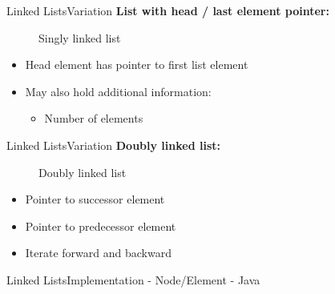 \begin{frame}{Linked Lists}{Variation}
  \textbf{List with head / last element pointer:}
  \begin{figure}
    
    \caption{Singly linked list}
    \label{fig:linked_list:variation:singly_linked_list_with_head}
  \end{figure}
  \begin{itemize}
    \item<3->
      Head element has pointer to first list element
    \item<4->
      May also hold additional information:
      \begin{itemize}
        \item<5->
          Number of elements
      \end{itemize}
  \end{itemize}
\end{frame}


\begin{frame}{Linked Lists}{Variation}
  \textbf{Doubly linked list:}
    \begin{figure}
    
    \caption{Doubly linked list}
    \label{fig:linked_list:variation:doubly_linked_list}
  \end{figure}
  \begin{itemize}
    \item<3->
      Pointer to successor element
    \item<4->
      Pointer to predecessor element
    \item<5->
      Iterate forward and backward
  \end{itemize}
\end{frame}



\begin{frame}[fragile]{Linked Lists}{Implementation - Node/Element - Java}
  \small{
  }
\end{frame}

